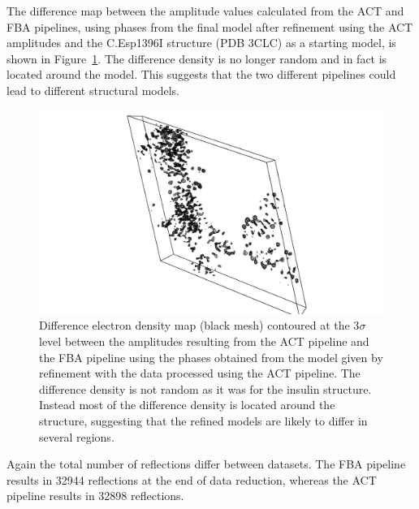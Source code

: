 The difference map between the amplitude values calculated from the ACT and FBA pipelines, using phases from the final model after refinement using the ACT amplitudes and the C.Esp1396I structure (PDB 3CLC) as a starting model, is shown in Figure~\ref{fig:Difference electron density map - C.Esp1396I}.
The difference density is no longer random and in fact is located around the model.
This suggests that the two different pipelines could lead to different structural models.
\begin{figure}[ht!]
    \centering
    \includegraphics[width=1.0\textwidth]{figures/datared/CPROT_diff_map.png}
    \caption[Difference electron density map for the C.Esp1396I dataset.]{Difference electron density map (black mesh) contoured at the 3$\sigma$ level between the amplitudes resulting from the ACT pipeline and the FBA pipeline using the phases obtained from the model given by refinement with the data processed using the ACT pipeline.
    The difference density is not random as it was for the insulin structure.
    Instead most of the difference density is located around the structure, suggesting that the refined models are likely to differ in several regions.}
    \label{fig:Difference electron density map - C.Esp1396I}
\end{figure}

Again the total number of reflections differ between datasets.
The FBA pipeline results in 32944 reflections at the end of data reduction, whereas the ACT pipeline results in 32898 reflections.

